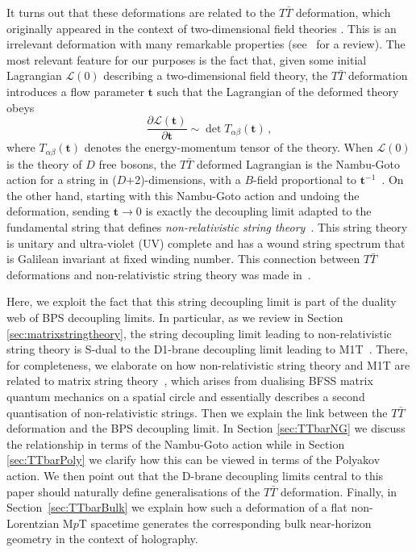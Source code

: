\documentclass[11pt]{article}
\newcommand{\be}{\begin{equation}}
\newcommand{\ee}{\end{equation}}
\renewcommand{\emph}[1]{\textit{#1}}
\newcommand{\lambdap}{\boldsymbol{t}}
\begin{document}
It turns out that these deformations are related to the $T \bar T$ deformation, which originally appeared in the context of two-dimensional field theories \cite{Zamolodchikov:2004ce,Smirnov:2016lqw}.
This is an irrelevant deformation with many remarkable properties (see~\cite{Jiang:2019epa} for a review).
The most relevant feature for our purposes is the fact that, given some initial Lagrangian $\mathcal{L}(0)$ describing a two-dimensional field theory, the $T \bar T$ deformation introduces a flow parameter $\lambdap$ such that the Lagrangian of the deformed theory obeys 
%
\be
    \frac{\mathcal{\partial \mathcal{L}(\lambdap)}}{\partial \lambdap} \sim \det T_{\alpha \beta}(\lambdap)\,,
\ee
%
where $T_{\alpha \beta}(\lambdap)$ denotes the energy-momentum tensor of the theory.
When $\mathcal{L}(0)$ is the theory of $D$ free bosons, the $T \bar T$ deformed Lagrangian is the Nambu-Goto action for a string in ($D$+2)-dimensions, with a $B$-field proportional to $\lambdap^{-1}$~\cite{Cavaglia:2016oda,Bonelli:2018kik}.
On the other hand, starting with this Nambu-Goto action and undoing the deformation, sending $\lambdap\rightarrow 0$ is exactly the decoupling limit adapted to the fundamental string 
that defines \emph{non-relativistic string theory}~\cite{Klebanov:2000pp, Gomis:2000bd, Danielsson:2000gi}. This string theory is unitary and ultra-violet (UV) complete and has a wound string spectrum that is Galilean invariant at fixed winding number. 
This connection between $T\bar T$ deformations and non-relativistic string theory was made in~\cite{Blair:2020ops}.

Here, we exploit the fact that this string decoupling limit is part of the duality web of BPS decoupling limits.
In particular, as we review in Section \ref{sec:matrixstringtheory}, the string decoupling limit leading to non-relativistic string theory is S-dual to the D1-brane decoupling limit leading to M1T~\cite{Ebert:2023hba}.
There, for completeness, we elaborate on how non-relativistic string theory and M1T are related to matrix string theory~\cite{Motl:1997th, Dijkgraaf:1997vv}, which arises from dualising BFSS matrix quantum mechanics on a spatial circle and essentially describes a second quantisation of non-relativistic strings.
Then we explain the link between the $T \bar T$ deformation and the BPS decoupling limit. In Section \ref{sec:TTbarNG} we discuss the relationship in terms of the Nambu-Goto action while in Section \ref{sec:TTbarPoly} we clarify how this can be viewed in terms of the Polyakov action.
We then point out that the D-brane decoupling limits central to this paper should naturally define generalisations of the $T \bar T$ deformation. Finally, in Section~\ref{sec:TTbarBulk} we explain how such a deformation of a flat non-Lorentzian M$p$T spacetime generates the corresponding bulk near-horizon geometry in the context of holography.
\end{document}
